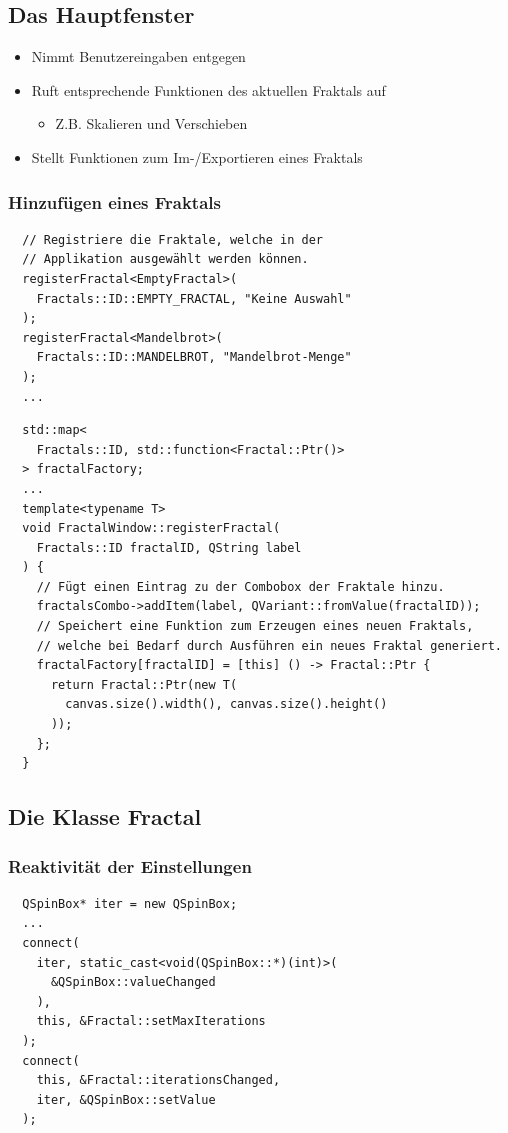 \documentclass[unknownkeysallowed]{beamer}
\begin{document}
\subsection{Das Hauptfenster}

\begin{frame}
  \begin{itemize}
    \frametitle{Das Hauptfenster}
    \item Nimmt Benutzereingaben entgegen
    \item Ruft entsprechende Funktionen des aktuellen Fraktals auf
    \begin{itemize}
      \item Z.B. Skalieren und Verschieben
    \end{itemize}
    \item Stellt Funktionen zum Im-/Exportieren eines Fraktals
  \end{itemize}
\end{frame}

\begin{frame}[fragile]
  \frametitle{Hinzufügen eines Fraktals}
  \begin{verbatim}
  // Registriere die Fraktale, welche in der
  // Applikation ausgewählt werden können.
  registerFractal<EmptyFractal>(
    Fractals::ID::EMPTY_FRACTAL, "Keine Auswahl"
  );
  registerFractal<Mandelbrot>(
    Fractals::ID::MANDELBROT, "Mandelbrot-Menge"
  );
  ...
  \end{verbatim}
\end{frame}

\begin{frame}[fragile]
  \begin{verbatim}
  std::map<
    Fractals::ID, std::function<Fractal::Ptr()>
  > fractalFactory;
  ...
  template<typename T>
  void FractalWindow::registerFractal(
    Fractals::ID fractalID, QString label
  ) {
    // Fügt einen Eintrag zu der Combobox der Fraktale hinzu.
    fractalsCombo->addItem(label, QVariant::fromValue(fractalID));
    // Speichert eine Funktion zum Erzeugen eines neuen Fraktals,
    // welche bei Bedarf durch Ausführen ein neues Fraktal generiert.
    fractalFactory[fractalID] = [this] () -> Fractal::Ptr {
      return Fractal::Ptr(new T(
        canvas.size().width(), canvas.size().height()
      ));
    };
  }
  \end{verbatim}
\end{frame}

\subsection{Die Klasse Fractal}
\begin{frame}[fragile]
  \frametitle{Reaktivität der Einstellungen}
  \begin{verbatim}
  QSpinBox* iter = new QSpinBox;
  ...
  connect(
    iter, static_cast<void(QSpinBox::*)(int)>(
      &QSpinBox::valueChanged
    ),
    this, &Fractal::setMaxIterations
  );
  connect(
    this, &Fractal::iterationsChanged,
    iter, &QSpinBox::setValue
  );
  \end{verbatim}
\end{frame}
\end{document}
